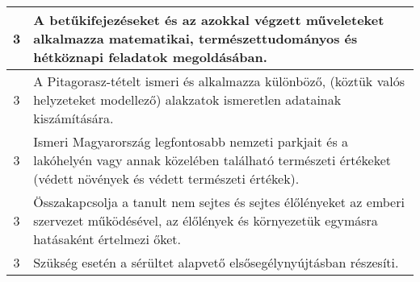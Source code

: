 \begin{longtable}{c | p{12cm} }
                                          3 &  A betűkifejezéseket és az azokkal végzett műveleteket alkalmazza matematikai, természettudományos és hétköznapi feladatok megoldásában. \\ \hline
                                          3 &  A Pitagorasz-tételt ismeri és alkalmazza különböző, (köztük valós helyzeteket modellező) alakzatok ismeretlen adatainak kiszámítására. \\ \hline
                                          3 &  Ismeri Magyarország legfontosabb nemzeti parkjait és a lakóhelyén vagy annak közelében található természeti értékeket (védett növények és védett természeti értékek). \\ \hline
                                          3 &  Összakapcsolja a tanult nem sejtes és sejtes élőlényeket az emberi szervezet működésével, az élőlények és környezetük egymásra hatásaként értelmezi őket. \\ \hline
                                          3 &  Szükség esetén a sérültet alapvető elsősegélynyújtásban részesíti. \\ \hline
                                      

\end{longtable}
